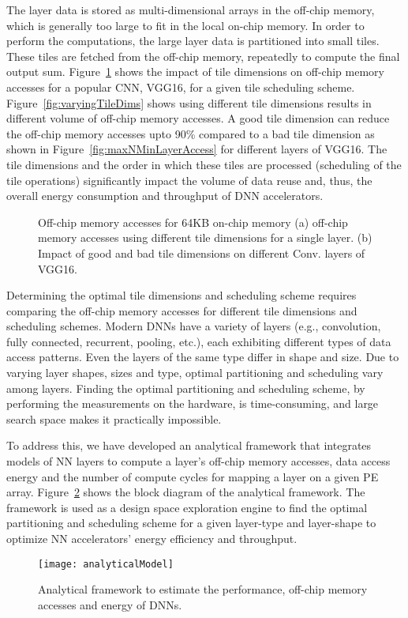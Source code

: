 The layer data is stored as multi-dimensional arrays in the off-chip memory, which is generally too large to fit in the local on-chip memory. In order to perform the computations, the large layer data is partitioned into small tiles.  These tiles are fetched from the off-chip memory, repeatedly to compute the final output sum. Figure~\ref{fig:impactOfTileDims} shows the impact of tile dimensions on off-chip memory accesses for a popular CNN, VGG16, for a given tile scheduling scheme. Figure~\ref{fig:varyingTileDims} shows using different tile dimensions results in different volume of off-chip memory accesses. A good tile dimension can reduce the off-chip memory accesses upto 90\% compared to a bad tile dimension as shown in Figure~\ref{fig:maxNMinLayerAccess} for different layers of VGG16. The tile dimensions and the order in which these tiles are processed (scheduling of the tile operations) significantly impact the volume of data reuse and, thus, the overall energy consumption and throughput of DNN accelerators.
\begin{figure}[!h]
	\centering
	\captionsetup{font=sf}
	\hfil	
	\hfil	
	\caption{Off-chip memory accesses for 64KB on-chip memory (a) off-chip memory accesses using different tile dimensions for a single layer. (b) Impact of good and bad tile dimensions on different Conv. layers of VGG16.}
	\label{fig:impactOfTileDims}
\end{figure}

Determining the optimal tile dimensions and scheduling scheme requires comparing the off-chip memory accesses for different tile dimensions and scheduling schemes. Modern DNNs have a variety of layers (e.g., convolution, fully connected, recurrent, pooling, etc.), each exhibiting different types of data access patterns. Even the layers of the same type differ in shape and size. Due to varying layer shapes, sizes and type, optimal partitioning and scheduling vary among layers. Finding the optimal partitioning and scheduling scheme, by performing the measurements on the hardware, is time-consuming, and large search space makes it practically impossible.

To address this, we have developed an analytical framework that integrates models of NN layers to compute a layer's off-chip memory accesses, data access energy and the number of compute cycles for mapping a layer on a given PE array. Figure~\ref{fig:analyticalModel} shows the block diagram of the analytical framework. The framework is used as a design space exploration engine to find the optimal partitioning and scheduling scheme for a given layer-type and layer-shape to optimize NN accelerators' energy efficiency and throughput. 
\begin{figure}[!htb]
	\centering
    \captionsetup{font=sf}	
	\texttt{[image: analyticalModel]}
	\caption{Analytical framework to estimate the performance, off-chip memory accesses and energy of DNNs.}
	\label{fig:analyticalModel}
\end{figure}

